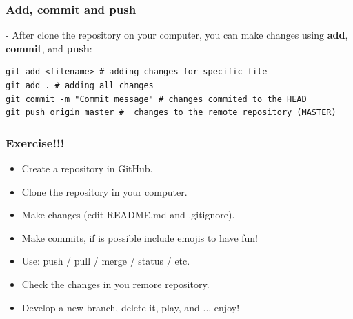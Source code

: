 \documentclass{beamer}
\begin{document}
\begin{frame}[fragile]
\frametitle{Add, commit and push}

- After clone the repository on your computer, you can make changes using \textbf{add}, \textbf{commit}, and \textbf{push}:

\begin{lstlisting}
git add <filename> # adding changes for specific file
git add . # adding all changes
git commit -m "Commit message" # changes commited to the HEAD
git push origin master #  changes to the remote repository (MASTER)
\end{lstlisting}

\end{frame}

\begin{frame}[fragile]
\frametitle{Exercise!!!}

\begin{itemize}
    \item Create a repository in GitHub.
    \item Clone the repository in your computer.
    \item Make changes (edit README.md and .gitignore).
    \item Make commits, if is possible include emojis to have fun! 
    \item Use: push / pull / merge / status / etc.
    \item Check the changes in you remore repository.
    \item Develop a new branch, delete it, play, and ... enjoy! \faSmileO
\end{itemize}


\end{frame}
\end{document}
